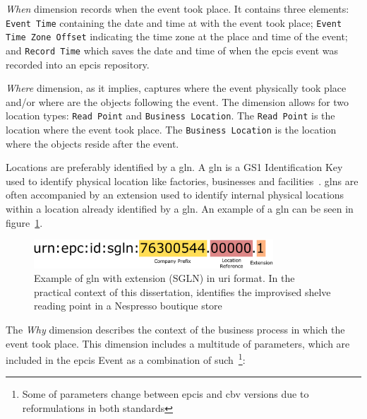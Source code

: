 \emph{When} dimension records when the event took place. It contains three elements: \texttt{Event Time} containing the date and time at with the event took place; \texttt{Event Time Zone Offset} indicating the time zone at the place and time of the event; and \texttt{Record Time} which saves the date and time of when the \ac{epcis} event was recorded into an \ac{epcis} repository.

\emph{Where} dimension, as it implies, captures where the event physically took place and/or where are the objects following the event. The dimension allows for two location types: \texttt{Read Point} and \texttt{Business Location}.
The \texttt{Read Point} is the location where the event took place. The \texttt{Business Location} is the location where the objects reside after the event.

Locations are preferably identified by a \ac{gln}. A \ac{gln} is a GS1 Identification Key used to identify physical location like factories, businesses and facilities~\cite{GS1KeysImplementation}. \acp{gln} are often accompanied by an extension used to identify internal physical locations within a location already identified by a \ac{gln}. An example of a \ac{gln} can be seen in figure~\ref{fig:gln}. 

\begin{figure}[]
    \centering
    \includegraphics[width=0.8\textwidth]{./figs/02-state-of-the-art/sglnexample.pdf}
    \caption[Example of \ac{gln} with extension (SGLN) in \ac{uri} format]{Example of \ac{gln} with extension (SGLN) in \ac{uri} format. In the practical context of this dissertation, identifies the improvised shelve reading point in a Nespresso boutique store} 
    \label{fig:gln}
\end{figure}

The \emph{Why} dimension describes the context of the business process in which the event took place.
This dimension includes a multitude of parameters, which are included in the \ac{epcis} Event as a combination of such~\footnote{Some of parameters change between \ac{epcis} and \ac{cbv} versions due to reformulations in both standards}:

